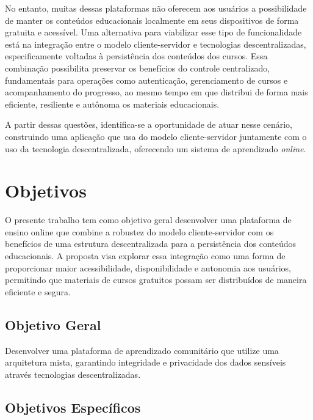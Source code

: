 No entanto, muitas dessas plataformas não oferecem aos usuários a possibilidade de manter os conteúdos educacionais localmente em seus dispositivos de forma gratuita e acessível. Uma alternativa para viabilizar esse tipo de funcionalidade está na integração entre o modelo cliente-servidor e tecnologias descentralizadas, especificamente voltadas à persistência dos conteúdos dos cursos. Essa combinação possibilita preservar os benefícios do controle centralizado, fundamentais para operações como autenticação, gerenciamento de cursos e acompanhamento do progresso, ao mesmo tempo em que distribui de forma mais eficiente, resiliente e autônoma os materiais educacionais.

A partir dessas questões, identifica-se a oportunidade de atuar nesse cenário, construindo uma aplicação que usa do modelo cliente-servidor juntamente com o uso da tecnologia descentralizada, oferecendo um sistema de aprendizado \textit{online}.

\section{Objetivos}

O presente trabalho tem como objetivo geral desenvolver uma plataforma de ensino online que combine a robustez do modelo cliente-servidor com os benefícios de uma estrutura descentralizada para a persistência dos conteúdos educacionais. A proposta visa explorar essa integração como uma forma de proporcionar maior acessibilidade, disponibilidade e autonomia aos usuários, permitindo que materiais de cursos gratuitos possam ser distribuídos de maneira eficiente e segura.

\subsection{Objetivo Geral}

Desenvolver uma plataforma de aprendizado comunitário que utilize uma arquitetura mista, garantindo integridade e privacidade dos dados sensíveis através tecnologias descentralizadas.

\subsection{Objetivos Específicos}


